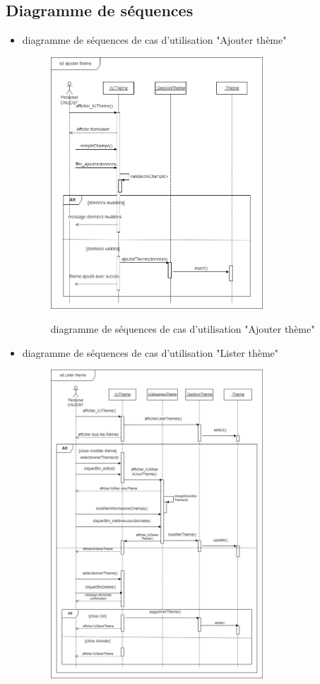 \subsection{Diagramme de séquences}
\begin{itemize}
	\item diagramme de séquences de cas d'utilisation "Ajouter thème"
\begin{figure}[!h]
	\centering
	{\includegraphics[width=0.75\textwidth]{D) IMAGES/diagseq1.png}}
	\caption{diagramme de séquences de cas d'utilisation "Ajouter thème"}
	\label{Org}
\end{figure}
\item diagramme de séquences de cas d'utilisation "Lister thème"
\begin{figure}[!h]
	\centering
	{\includegraphics[width=0.75\textwidth]{D) IMAGES/diagSeqLister.png}}

\end{figure}
\end{itemize}
